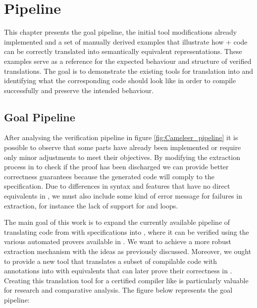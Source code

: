 
%


\chapter{Pipeline}
\label{cha:Pipeline}

This chapter presents the goal pipeline, the initial tool modifications already implemented and a set of manually derived examples that 
illustrate how \ocaml + \gospel code can be correctly translated into 
semantically equivalent \cml representations. These examples serve as a reference for the expected behaviour and structure of verified 
translations. The goal is to demonstrate the existing tools for translation into \cml and identifying what the corresponding \cml code 
should look like in order to compile successfully and preserve the intended behaviour.

\section{Goal Pipeline}

After analysing the verification pipeline in figure \ref{fig:Cameleer_pipeline} it is possible to observe that some parts have already been 
implemented or require only minor adjustments to meet their objectives. By modifying the extraction process in \whythree to check if the 
proof has been discharged we can provide better correctness guarantees because the generated \cml code will comply to the specification. 
Due to differences in syntax and features that have no direct equivalents in \cml, we must also include some kind of error message for 
failures in extraction, for instance the lack of support for  and  loops.

The main goal of this work is to expand the currently available pipeline of translating code from \ocaml with \gospel specifications 
into \whyml, where it can be verified using the various automated provers available in \whythree. We want to achieve 
a more robust extraction mechanism with the ideas as previously discussed. Moreover, we ought to provide a new tool that 
translates a subset of compilable \cml code with \gospel annotations into \ocaml with \gospel equivalents that can later
prove their correctness in \cameleer. Creating this translation tool for a certified compiler like \cml is particularly valuable for 
research and comparative analysis. The figure below represents the goal pipeline:

